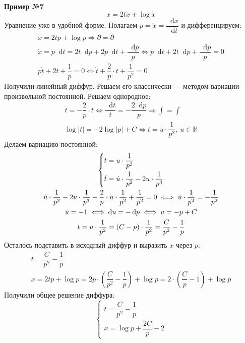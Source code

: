 \documentclass[a4paper,12pt]{article}
\newcommand{\R}{\mathbb{R}}
\renewcommand*\d{\mathop{}\!\mathrm{d}}
\newcommand{\dt}{\dot{t}}
\newcommand{\du}{\dot{u}}
\newcommand{\dx}{\dot{x}}
\newcommand{\bto}{\Longrightarrow}
\newcommand{\ds}{\displaystyle}
\begin{document}
\textbf{Пример №7}
\[x = 2t\dx + \log\dx\]
Уравнение уже в удобной форме. Полагаем $p = \dx = \dfrac{\d x}{\d t}$ и дифференцируем:
\begin{gather*}
	x = 2tp + \log p \bto \partial = \partial \\
	\dx = p\d t = 2t\d p + 2p\d t + \dfrac{\d p}{p} \iff p\d t + 2t\d p + \dfrac{\d p}{p} = 0\\
	p\dt + 2t + \dfrac{1}{p} = 0 \iff \dt + \dfrac{2}{p} \cdot t + \dfrac{1}{p^2} = 0
\end{gather*}
Получили линейный диффур. Решаем его классически --- методом вариации произвольной постоянной.
Решаем однородное:
\begin{gather*}
\dt = -\dfrac{2}{p} \cdot t \iff \dfrac{\d t}{t} = -\dfrac{2\d p}{p} \bto \ds\int = \int\\
\log|t| = -2\log|p| + C \iff t = u \cdot \dfrac{1}{p^2},\ u \in \R
\end{gather*}
Делаем вариацию постоянной:
\begin{gather*}
\left\{\begin{gathered}
t = u \cdot \dfrac{1}{p^2}\hfill\\
\dt = \du \cdot \dfrac{1}{p^2} - 2u \cdot \dfrac{1}{p^3}\hfill
\end{gathered}\right.\\
\du \cdot \dfrac{1}{p^2} - 2u \cdot \dfrac{1}{p^3} + \dfrac{2}{p} \cdot u \cdot \dfrac{1}{p^2} + \dfrac{1}{p^2} = 0 \iff \du \cdot \dfrac{1}{p^2} = -\dfrac{1}{p^2}\\
\du = -1 \iff \d u = -\d p \iff u = -p + C\\
t = u \cdot \dfrac{1}{p^2} = (C - p) \cdot \dfrac{1}{p^2} = \dfrac{C}{p^2} -\dfrac{1}{p}
\end{gather*}
Осталось подставить в исходный диффур и выразить $x$ через $p$:
\begin{gather*}
t = \dfrac{C}{p^2} -\dfrac{1}{p}\\
x = 2tp + \log p = 2p\cdot \left(\dfrac{C}{p^2} -\dfrac{1}{p}\right) + \log p = 2 \cdot \left(\dfrac{C}{p} - 1\right) + \log p
\end{gather*}
Получили общее решение диффура:
\[\begin{cases}
	t = \dfrac{C}{p^2} -\dfrac{1}{p}\\
	x = \log p + \dfrac{2C}{p} - 2
\end{cases}\]
\end{document}
